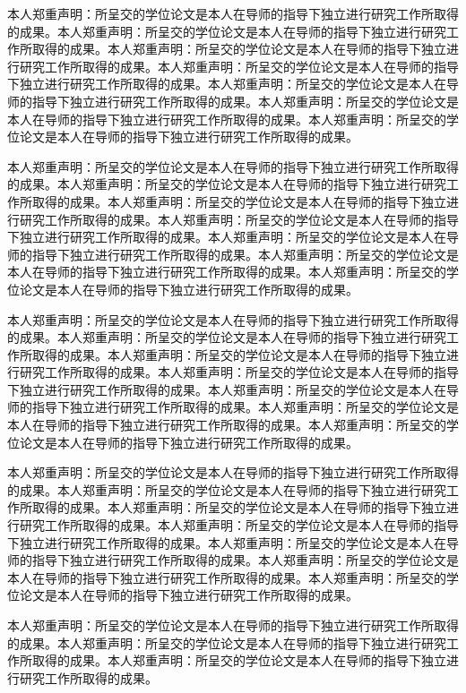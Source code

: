 \documentclass[class = professional, twoside, AutoFakeBold=3.17,AutoFakeSlant=0.2]{gdufe_master_thesis}
\begin{document}
本人郑重声明：所呈交的学位论文是本人在导师的指导下独立进行研究工作所取得的成果。本人郑重声明：所呈交的学位论文是本人在导师的指导下独立进行研究工作所取得的成果。本人郑重声明：所呈交的学位论文是本人在导师的指导下独立进行研究工作所取得的成果。本人郑重声明：所呈交的学位论文是本人在导师的指导下独立进行研究工作所取得的成果。本人郑重声明：所呈交的学位论文是本人在导师的指导下独立进行研究工作所取得的成果。本人郑重声明：所呈交的学位论文是本人在导师的指导下独立进行研究工作所取得的成果。本人郑重声明：所呈交的学位论文是本人在导师的指导下独立进行研究工作所取得的成果。
    \the\baselineskip

 本人郑重声明：所呈交的学位论文是本人在导师的指导下独立进行研究工作所取得的成果。本人郑重声明：所呈交的学位论文是本人在导师的指导下独立进行研究工作所取得的成果。本人郑重声明：所呈交的学位论文是本人在导师的指导下独立进行研究工作所取得的成果。本人郑重声明：所呈交的学位论文是本人在导师的指导下独立进行研究工作所取得的成果。本人郑重声明：所呈交的学位论文是本人在导师的指导下独立进行研究工作所取得的成果。本人郑重声明：所呈交的学位论文是本人在导师的指导下独立进行研究工作所取得的成果。本人郑重声明：所呈交的学位论文是本人在导师的指导下独立进行研究工作所取得的成果。
    \the\baselineskip

{ 本人郑重声明：所呈交的学位论文是本人在导师的指导下独立进行研究工作所取得的成果。本人郑重声明：所呈交的学位论文是本人在导师的指导下独立进行研究工作所取得的成果。本人郑重声明：所呈交的学位论文是本人在导师的指导下独立进行研究工作所取得的成果。本人郑重声明：所呈交的学位论文是本人在导师的指导下独立进行研究工作所取得的成果。本人郑重声明：所呈交的学位论文是本人在导师的指导下独立进行研究工作所取得的成果。本人郑重声明：所呈交的学位论文是本人在导师的指导下独立进行研究工作所取得的成果。本人郑重声明：所呈交的学位论文是本人在导师的指导下独立进行研究工作所取得的成果。
\the\baselineskip}

本人郑重声明：所呈交的学位论文是本人在导师的指导下独立进行研究工作所取得的成果。本人郑重声明：所呈交的学位论文是本人在导师的指导下独立进行研究工作所取得的成果。本人郑重声明：所呈交的学位论文是本人在导师的指导下独立进行研究工作所取得的成果。本人郑重声明：所呈交的学位论文是本人在导师的指导下独立进行研究工作所取得的成果。本人郑重声明：所呈交的学位论文是本人在导师的指导下独立进行研究工作所取得的成果。本人郑重声明：所呈交的学位论文是本人在导师的指导下独立进行研究工作所取得的成果。本人郑重声明：所呈交的学位论文是本人在导师的指导下独立进行研究工作所取得的成果。
\the\baselineskip

 本人郑重声明：所呈交的学位论文是本人在导师的指导下独立进行研究工作所取得的成果。本人郑重声明：所呈交的学位论文是本人在导师的指导下独立进行研究工作所取得的成果。本人郑重声明：所呈交的学位论文是本人在导师的指导下独立进行研究工作所取得的成果。
\the\baselineskip
\end{document}
